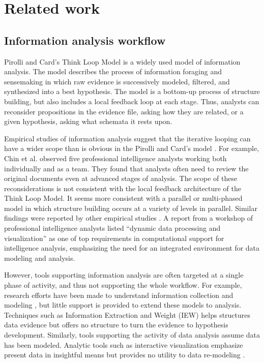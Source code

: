 \section{Related work}\label{related-work}

\subsection{Information analysis workflow}

Pirolli and Card's Think Loop Model \cite{Pirolli2005} is a widely used model of information analysis. The model describes the process of information foraging and sensemaking in which raw evidence is successively modeled, filtered, and synthesized into a best hypothesis. The model is a bottom-up process of structure building, but also includes a local feedback loop at each stage. Thus, analysts can reconsider propositions in the evidence file, asking how they are related, or a given hypothesis, asking what schemata it rests upon.

Empirical studies of information analysis suggest that the iterative looping can
have a wider scope than is obvious in the Pirolli and Card's model
\cite{Pirolli2005}. For example, Chin et al. \cite{Chin2009} observed five
professional intelligence analysts working both individually and as a team. They
found that analysts often need to review the original documents even at advanced
stages of analysis. The scope of these reconsiderations is not consistent with
the local feedback architecture of the Think Loop Model. It seems more
consistent with a parallel or multi-phased model \cite{Wheaton2011} in which
structure building occurs at a variety of levels in parallel. Similar findings
were reported by other empirical studies
\cite{Isenberg2008b,Kang2011,Herrmann2013a}. A report \cite{Badalamente2005}
from a workshop of professional intelligence analysts listed ``dynamic data
processing and visualization'' as one of top requirements in computational
support for intelligence analysis, emphasizing the need for an integrated
environment for data modeling and analysis.

However, tools supporting information analysis are often targeted at a single phase of activity, and thus not supporting the whole workflow. For example, research efforts have been made to understand information collection and modeling \cite{Shah2014i, Jansen2010c}, but little support is provided to extend these models to analysis. Techniques such as Information Extraction and Weight (IEW) helps structures data evidence but offers no structure to turn the evidence to hypothesis development. Similarly, tools supporting the activity of data analysis assume data has been modeled. Analytic tools such as interactive visualization emphasize present data in insightful means but provides no utility to data re-modeling \cite{Ware2012}.

